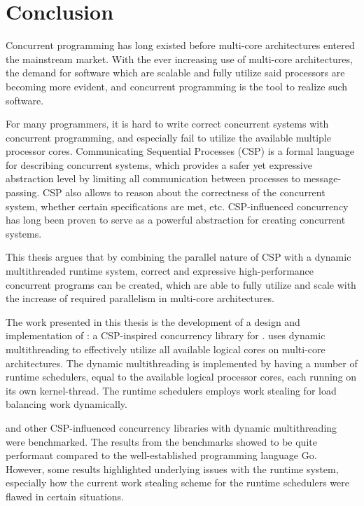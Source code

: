 

\chapter{Conclusion}
\label{ch:conclusion}

Concurrent programming has long existed before multi\hyp{}core architectures entered the mainstream market. With the ever increasing use of multi\hyp{}core architectures, the demand for software which are scalable and fully utilize said processors are becoming more evident, and concurrent programming is the tool to realize such software.

For many programmers, it is hard to write correct concurrent systems with concurrent programming, and especially fail to utilize the available multiple processor cores. Communicating Sequential Processes (CSP) is a formal language for describing concurrent systems, which provides a safer yet expressive abstraction level by limiting all communication between processes to message\hyp{}passing. CSP also allows to reason about the correctness of the concurrent system, whether certain specifications are met, etc. CSP\hyp{}influenced concurrency has long been proven to serve as a powerful abstraction for creating concurrent systems.

This thesis argues that by combining the parallel nature of CSP with a dynamic multithreaded runtime system, correct and expressive high\hyp{}performance concurrent programs can be created, which are able to fully utilize and scale with the increase of required parallelism in multi\hyp{}core architectures.

The work presented in this thesis is the development of a design and implementation of \Proxc{}: a CSP\hyp{}inspired concurrency library for \Cpp{}. \Proxc{} uses dynamic multithreading to effectively utilize all available logical cores on multi\hyp{}core architectures. The dynamic multithreading is implemented by having a number of runtime schedulers, equal to the available logical processor cores, each running on its own kernel\hyp{}thread. The runtime schedulers employs work stealing for load balancing work dynamically. 

\Proxc{} and other CSP\hyp{}influenced concurrency libraries with dynamic multithreading were benchmarked. The results from the benchmarks showed \Proxc{} to be quite performant compared to the well\hyp{}established programming language Go. However, some results highlighted underlying issues with the runtime system, especially how the current work stealing scheme for the runtime schedulers were flawed in certain situations.

